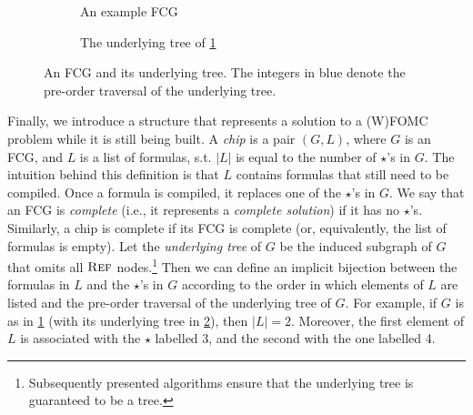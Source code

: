 \begin{figure}[t]
  \centering
  \begin{subfigure}{0.49\textwidth}
    \centering
    \caption{An example FCG}\label{fig:smallexample1}
  \end{subfigure}
  \begin{subfigure}{0.49\textwidth}
    \centering
    \caption{The underlying tree of
      \cref{fig:smallexample1}}\label{fig:smallexample2}
  \end{subfigure}
  \caption{An FCG and its underlying tree. The integers in blue denote the
    pre-order traversal of the underlying tree.}\label{fig:ordering}
\end{figure}

Finally, we introduce a structure that represents a solution to a (W)FOMC
problem while it is still being built. A \emph{chip} is a pair $(G, L)$, where
$G$ is an FCG, and $L$ is a list of formulas, s.t. $|L|$ is equal to the number
of $\star$'s in $G$. The intuition behind this definition is that $L$ contains
formulas that still need to be compiled. Once a formula is compiled, it replaces
one of the $\star$'s in $G$. We say that an FCG is \emph{complete} (i.e., it
represents a \emph{complete solution}) if it has no $\star$'s. Similarly, a chip
is complete if its FCG is complete (or, equivalently, the list of formulas is
empty). Let the \emph{underlying tree} of $G$ be the induced subgraph of $G$
that omits all $\operatorname{\textsc{Ref}}$ nodes.\footnote{Subsequently presented algorithms ensure
  that the underlying tree is guaranteed to be a tree.} Then we can define an
implicit bijection between the formulas in $L$ and the $\star$'s in $G$
according to the order in which elements of $L$ are listed and the pre-order
traversal of the underlying tree of $G$. For example, if $G$ is as in
\cref{fig:smallexample1} (with its underlying tree in \cref{fig:smallexample2}),
then $|L| = 2$. Moreover, the first element of $L$ is associated with the
$\star$ labelled 3, and the second with the one labelled 4.

